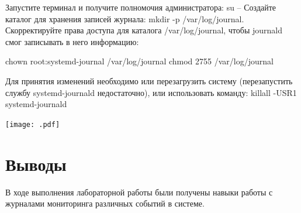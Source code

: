 \documentclass[
  english,
  russian,
  12pt,
  a4paper,
  DIV=11,
  numbers=noendperiod]{scrreprt}
\begin{document}
Запустите терминал и получите полномочия администратора: su -- Создайте
каталог для хранения записей журнала: mkdir -p /var/log/journal.
Скорректируйте права доступа для каталога /var/log/journal, чтобы
journald смог записывать в него информацию:

chown root:systemd-journal /var/log/journal chmod 2755 /var/log/journal

Для принятия изменений необходимо или перезагрузить систему
(перезапустить службу systemd-journald недостаточно), или использовать
команду: killall -USR1 systemd-journald

\texttt{[image: .pdf]}

\chapter{Выводы}\label{ux432ux44bux432ux43eux434ux44b}

В ходе выполнения лабораторной работы были получены навыки работы с
журналами мониторинга различных событий в системе.


\printbibliography
\end{document}
